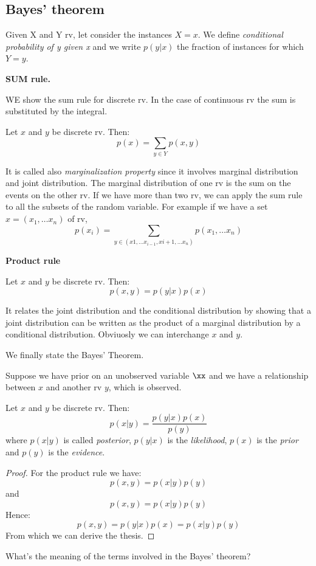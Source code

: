 \subsection{Bayes' theorem}

\begin{definition}
   Given X and Y rv, let  consider the instances $X=x$. We define \textit{conditional probability of y given x} and we write $p(y|x)$ the fraction of instances for which $Y=y$.
\end{definition}

\textbf{SUM rule.}

WE show the sum rule for  discrete rv. In the case of continuous rv the sum is substituted by the  integral.

\begin{proposition}
Let $x$ and $y$ be discrete rv. Then:
$$p(x)= \sum_{y \in Y} p(x,y)$$
\end{proposition}

It is called also \textit{marginalization property} since it involves marginal distribution and joint distribution. The marginal distribution of one rv is the sum on the events on the other rv. If we have more than two rv, we can apply the sum rule to all the subsets of the random variable. For example if we have a set $x=(x_1, \ldots x_n)$ of rv, 
$$p(x_i)=\sum_{y \in (x1, \ldots x_{i-1}, x{i+1}, \ldots x_n)} p(x_1, \ldots x_n)$$

\textbf{Product rule}

\begin{proposition}
Let $x$ and $y$ be discrete rv. Then:
$$p(x,y) =p(y|x)p(x)$$
\end{proposition}

It relates the joint distribution and the conditional distribution by showing that a joint distribution can be written as the product of a marginal distribution by a conditional distribution.
Obviuosly we can interchange $x$ and $y$.

We finally state the Bayes' Theorem.

Suppose we have prior on an unobserved variable $\xx$ and we have a relationship between $x$ and another rv $y$, which is observed.
\begin{proposition}
    Let $x$ and $y$ be discrete rv.
    Then:
    $$p(x|y)=\frac{p(y|x)p(x)}{p(y)}$$
    where $p(x|y)$ is called \textit{posterior}, $p(y|x)$ is the \textit{likelihood}, $p(x)$ is the \textit{prior} and $p(y)$ is the \textit{evidence}.
    \end{proposition}
    \begin{proof}
    For the product rule we have:
$$p(x,y) =p(x|y)p(y)$$
and
$$p(x,y) =p(x|y)p(y)$$
Hence:
$$p(x,y) =p(y|x)p(x)=p(x|y)p(y)$$
From which we can derive the thesis.
\end{proof}
What's the meaning of the terms involved in the Bayes' theorem?

